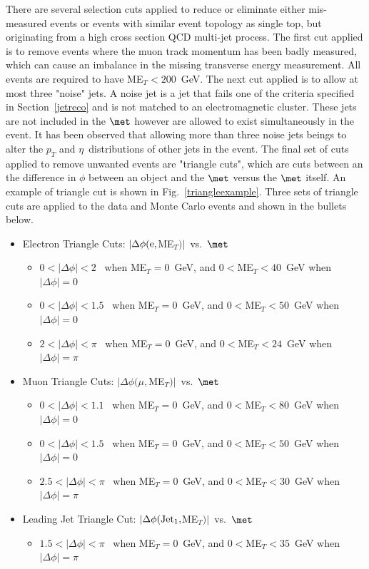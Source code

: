 There are several selection cuts applied to reduce or eliminate either mis-measured events or events with similar event topology as single top, but originating from a high cross section QCD multi-jet process. The first cut applied is to remove events where the muon track momentum has been badly measured, which can cause an imbalance in the missing transverse energy measurement. All events are required to have ME$_{T}<200$~GeV. The next cut applied is to allow at most three "noise" jets. A noise jet is a jet that fails one of the criteria specified in Section~\ref{jetreco} and is not matched to an electromagnetic cluster. These jets are not included in the $\met$ however are allowed to exist simultaneously in the event. It has been observed that allowing more than three noise jets beings to alter the $p_{T}$ and $\eta$~distributions of other jets in the event. The final set of cuts applied to remove unwanted events are "triangle cuts", which are cuts between an the difference in $\phi$ between an object and the $\met$ versus the $\met$ itself. An example of triangle cut is shown in Fig.~\ref{triangleexample}. Three sets of triangle cuts are applied to the data and Monte Carlo events and shown in the bullets below.

\begin{itemize}
\item Electron Triangle Cuts: $|\Delta\phi(\rm{e},$ME$_{T})|$~vs.~$\met$
   \begin{itemize}
   \item $0<|\Delta\phi|<2$~ when ME$_{T} = 0$~GeV, and $0<$ME$_{T}<40$~GeV when $|\Delta\phi| = 0$
   \item $0<|\Delta\phi|<1.5$~ when ME$_{T} = 0$~GeV, and $0<$ME$_{T}<50$~GeV when $|\Delta\phi| = 0$
   \item  $2<|\Delta\phi|<\pi$~ when ME$_{T} = 0$~GeV, and $0<$ME$_{T}<24$~GeV when $|\Delta\phi| = \pi$
   \end{itemize}
\item Muon Triangle Cuts: $|\Delta\phi(\mu,$ME$_{T})|$~vs.~$\met$
   \begin{itemize}
   \item  $0<|\Delta\phi|<1.1$~ when ME$_{T} = 0$~GeV, and $0<$ME$_{T}<80$~GeV when $|\Delta\phi| = 0$
   \item  $0<|\Delta\phi|<1.5$~ when ME$_{T} = 0$~GeV, and $0<$ME$_{T}<50$~GeV when $|\Delta\phi| = 0$
   \item $2.5<|\Delta\phi|<\pi$~ when ME$_{T} = 0$~GeV, and $0<$ME$_{T}<30$~GeV when $|\Delta\phi| = \pi$
   \end{itemize}
\item Leading Jet Triangle Cut: $|\Delta\phi(\rm{Jet_{1}},$ME$_{T})|$~vs.~$\met$
   \begin{itemize}
   \item $1.5<|\Delta\phi|<\pi$~ when ME$_{T} = 0$~GeV, and $0<$ME$_{T}<35$~GeV when $|\Delta\phi| = \pi$
   \end{itemize}
\end{itemize}



